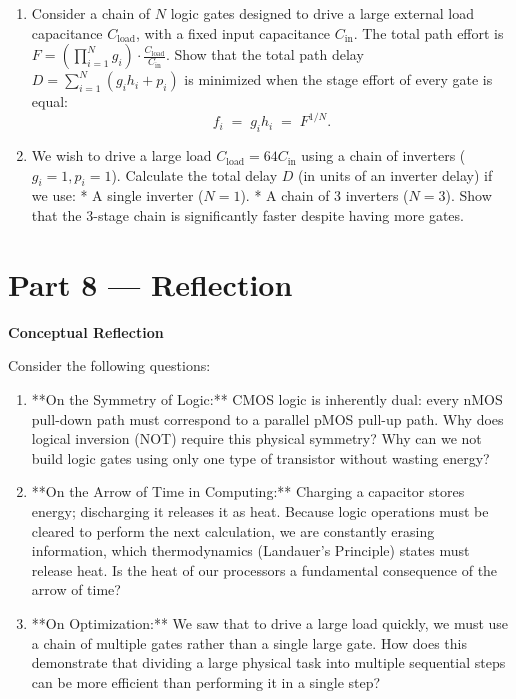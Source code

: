\documentclass[12pt, a4paper]{book}
\begin{document}
\begin{deepbox}
\begin{enumerate}[label=\textbf{D\arabic*.}]
        \begin{enumerate}[label=(\alph*)]
          \item Consider a chain of $N$ logic gates designed to drive a large external load capacitance $C_{\text{load}}$, with a fixed input capacitance $C_{\text{in}}$. The total path effort is $F = \left( \prod_{i=1}^N g_i \right) \cdot \frac{C_{\text{load}}}{C_{\text{in}}}$.
                Show that the total path delay $D = \sum_{i=1}^N (g_i h_i + p_i)$ is minimized when the stage effort of every gate is equal:
                \[
                  f_i \;=\; g_i h_i \;=\; F^{1/N}.
                \]
          \item We wish to drive a large load $C_{\text{load}} = 64 C_{\text{in}}$ using a chain of inverters ($g_i = 1, p_i = 1$).
                Calculate the total delay $D$ (in units of an inverter delay) if we use:
                * A single inverter ($N = 1$).
                * A chain of 3 inverters ($N = 3$).
                Show that the 3-stage chain is significantly faster despite having more gates.
        \end{enumerate}
\end{enumerate}
\end{deepbox}

\newpage

\section{Part 8 --- Reflection}

\begin{reflectionbox}
\textbf{Conceptual Reflection}

Consider the following questions:
\begin{enumerate}
  \item **On the Symmetry of Logic:** CMOS logic is inherently dual: every nMOS pull-down path must correspond to a parallel pMOS pull-up path. Why does logical inversion (NOT) require this physical symmetry? Why can we not build logic gates using only one type of transistor without wasting energy?
  \item **On the Arrow of Time in Computing:** Charging a capacitor stores energy; discharging it releases it as heat. Because logic operations must be cleared to perform the next calculation, we are constantly erasing information, which thermodynamics (Landauer's Principle) states must release heat. Is the heat of our processors a fundamental consequence of the arrow of time?
  \item **On Optimization:** We saw that to drive a large load quickly, we must use a chain of multiple gates rather than a single large gate. How does this demonstrate that dividing a large physical task into multiple sequential steps can be more efficient than performing it in a single step?
\end{enumerate}
\end{reflectionbox}
\end{document}
